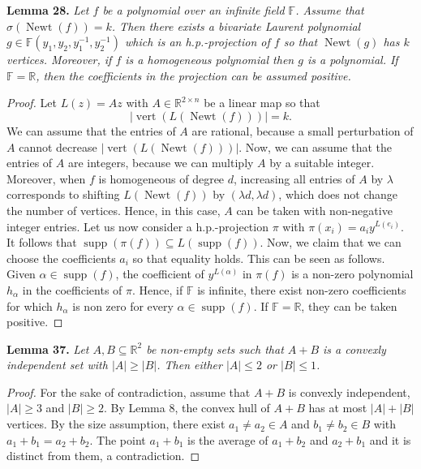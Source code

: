 \documentclass[10pt,a4paper]{article}
\newcommand{\supp}{\operatorname{supp}}
\newcommand{\Newt}{\operatorname{Newt}}
\newcommand{\vertset}{\operatorname{vert}}
\newenvironment{sourceresult}[1]{\par\medskip\noindent\textbf{#1.}\itshape}{\par\medskip}
\begin{document}
\begin{sourceresult}{Lemma 28}
Let $f$ be a polynomial over an infinite field $\mathbb F$. Assume that $\sigma(\Newt(f))=k$. Then there exists a bivariate Laurent polynomial $g\in\mathbb F(y_1,y_2,y_1^{-1},y_2^{-1})$ which is an h.p.-projection of $f$ so that $\Newt(g)$ has $k$ vertices. Moreover, if $f$ is a homogeneous polynomial then $g$ is a polynomial. If $\mathbb F=\mathbb R$, then the coefficients in the projection can be assumed positive.
\end{sourceresult}
\begin{proof}
Let $L(z)=Az$ with $A\in\mathbb R^{2\times n}$ be a linear map so that
\[|\vertset(L(\Newt(f)))|=k.\]
We can assume that the entries of $A$ are rational, because a small perturbation of $A$ cannot decrease $|\vertset(L(\Newt(f)))|$. Now, we can assume that the entries of $A$ are integers, because we can multiply $A$ by a suitable integer.
Moreover, when $f$ is homogeneous of degree $d$, increasing all entries of $A$ by $\lambda$ corresponds to shifting $L(\Newt(f))$ by $(\lambda d,\lambda d)$, which does not change the number of vertices. Hence, in this case, $A$ can be taken with non-negative integer entries.
Let us now consider a h.p.-projection $\pi$ with $\pi(x_i)=a_i y^{L(e_i)}$. It follows that $\supp(\pi(f))\subseteq L(\supp(f))$. Now, we claim that we can choose the coefficients $a_i$ so that equality holds. This can be seen as follows. Given $\alpha\in\supp(f)$, the coefficient of $y^{L(\alpha)}$ in $\pi(f)$ is a non-zero polynomial $h_\alpha$ in the coefficients of $\pi$. Hence, if $\mathbb F$ is infinite, there exist non-zero coefficients for which $h_\alpha$ is non zero for every $\alpha\in\supp(f)$. If $\mathbb F=\mathbb R$, they can be taken positive.
\end{proof}

\begin{sourceresult}{Lemma 37}
Let $A,B\subseteq\mathbb R^2$ be non-empty sets such that $A+B$ is a convexly independent set with $|A|\ge|B|$. Then either $|A|\le2$ or $|B|\le1$.
\end{sourceresult}
\begin{proof}
For the sake of contradiction, assume that $A+B$ is convexly independent, $|A|\ge3$ and $|B|\ge2$. By Lemma 8, the convex hull of $A+B$ has at most $|A|+|B|$ vertices. By the size assumption, there exist $a_1\ne a_2\in A$ and $b_1\ne b_2\in B$ with $a_1+b_1=a_2+b_2$. The point $a_1+b_1$ is the average of $a_1+b_2$ and $a_2+b_1$ and it is distinct from them, a contradiction.
\end{proof}
\end{document}
